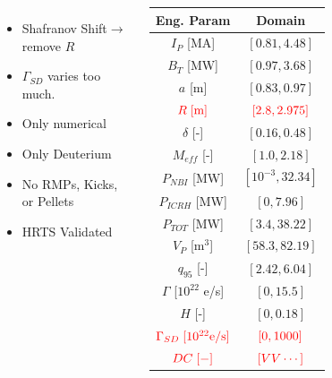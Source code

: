 \documentclass{beamer}
\begin{document}
\begin{frame}
\begin{columns}
\begin{itemize}
	\item Shafranov Shift$\rightarrow$ remove $R$
	\item $\Gamma_{SD}$ varies too much. 
	\item Only numerical 
	\item Only Deuterium 
	\item No RMPs, Kicks, or Pellets
	\item HRTS Validated 
\end{itemize}

\begin{tabular}{| c | c | }
	\hline
	Eng. Param & Domain \\
	\hline
	$I_P$ [MA] & $[0.81, 4.48]$ \\
	$B_T$ [MW] & $[0.97, 3.68]$ \\
	$a$ [m] & $[0.83, 0.97]$ \\
	\sout{$\color{red}R \; \text{[m]}$ } & \sout{$ \color{red}[2.8, 2.975]$} \\ 
	$\delta$ [-] & $[0.16, 0.48]$ \\
	$M_{eff}$ [-] & $[1.0, 2.18]$ \\
	$P_{NBI}$ [MW] & $[10^{-3}, 32.34]$ \\
	$P_{ICRH}$ [MW] & $[0, 7.96]$ \\
	$P_{TOT}$ [MW] & $[3.4, 38.22]$ \\
	$V_P$ [m$^3$] &  $[58.3, 82.19]$ \\
	$q_{95}$ [-] & $[2.42, 6.04]$ \\
	$\Gamma$ [$10^{22}$ e/s] & $[0, 15.5]$ \\
	$H$ [-] & $[0, 0.18]$ \\
	\sout{$\color{red} \Gamma_{SD} \; [10^{22} \text{e/s}]$} & \sout{$\color{red} [0, 1000]$} \\
	\sout{$\color{red}DC \; [-]$ } & \sout{$\color{red}[VV \cdots]$} \\
	\hline
\end{tabular}

\end{columns}
\end{frame}
\end{document}
